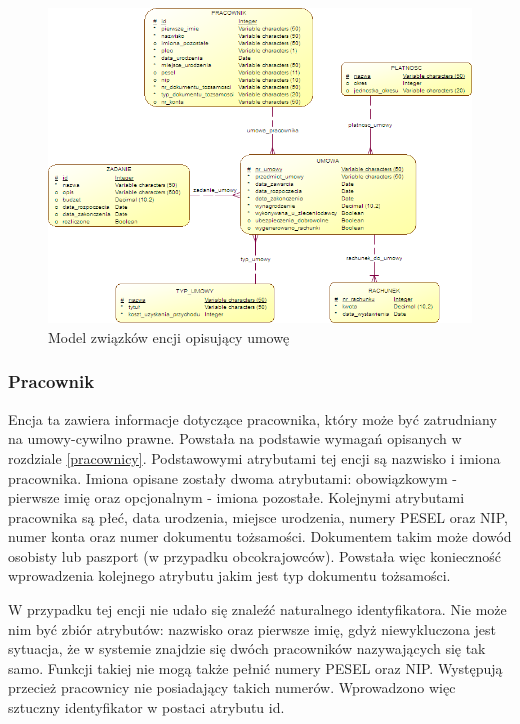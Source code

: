 \begin{figure}[]
    \begin{center}
	\includegraphics[scale=1,angle=-90]{img/logiczny3.png}
	\caption{Model związków encji opisujący umowę}
	\label{logiczny3}
    \end{center}
\end{figure}

\subsubsection{Pracownik}
Encja ta zawiera informacje dotyczące pracownika, który może być zatrudniany na umowy-cywilno prawne. Powstała na podstawie wymagań opisanych w rozdziale \ref{pracownicy}. Podstawowymi atrybutami tej encji są nazwisko i imiona pracownika. Imiona opisane zostały dwoma atrybutami: obowiązkowym - pierwsze imię oraz opcjonalnym - imiona pozostałe. Kolejnymi atrybutami pracownika są płeć, data urodzenia, miejsce urodzenia, numery PESEL oraz NIP, numer konta oraz numer dokumentu tożsamości. Dokumentem takim może dowód osobisty lub paszport  (w przypadku obcokrajowców). Powstała więc konieczność wprowadzenia kolejnego atrybutu jakim jest typ dokumentu tożsamości.

W przypadku tej encji nie udało się znaleźć naturalnego identyfikatora. Nie może nim być zbiór atrybutów: nazwisko oraz pierwsze imię, gdyż niewykluczona jest sytuacja, że w systemie znajdzie się dwóch pracowników nazywających się tak samo. Funkcji takiej nie mogą także pełnić numery PESEL oraz NIP. Występują przecież pracownicy nie posiadający takich numerów. Wprowadzono więc sztuczny identyfikator w postaci atrybutu id.

